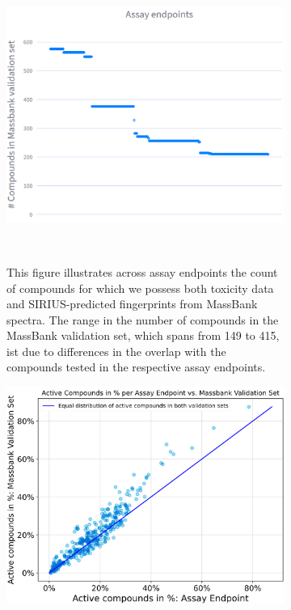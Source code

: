 \begin{enumerate}
    
    \begin{figure}
        \centering
        \begin{subfigure}[b]{0.48\textwidth}
            \centering
            \includegraphics[width=\textwidth]{figures/Massbank_overlap.png}
            \caption{This figure illustrates across assay endpoints the count of compounds for which we possess both toxicity data and SIRIUS-predicted fingerprints from MassBank spectra. The range in the number of compounds in the MassBank validation set, which spans from 149 to 415, ist due to differences in the overlap with the compounds tested in the respective assay endpoints.}
        ~\label{fig:MassBank_overlap}
        \end{subfigure}
        \hfill
        \begin{subfigure}[b]{0.48\textwidth}
            \centering
            \includegraphics[width=\textwidth]{figures/activity_ratio_comparison.png}

\end{subfigure}
\end{figure}
\end{enumerate}
